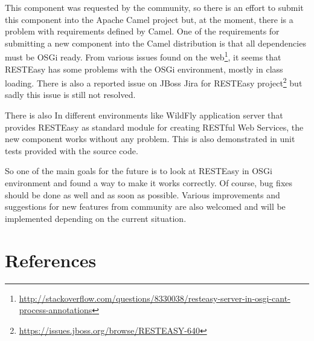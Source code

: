 \documentclass[12pt,final,oneside]{fithesis2}
\begin{document}
This component was requested by the community, so there is an effort to submit this component into the Apache Camel project but, at the moment, there is a problem with requirements defined by Camel. One of the requirements for submitting a new component into the Camel distribution is that all dependencies must be OSGi ready. From various issues found on the web\footnote{\url{http://stackoverflow.com/questions/8330038/resteasy-server-in-osgi-cant-process-annotations}}, it seems that RESTEasy has some problems with the OSGi environment, mostly in class loading. There is also a reported issue on JBoss Jira for RESTEasy project\footnote{\url{https://issues.jboss.org/browse/RESTEASY-640}} but sadly this issue is still not resolved.

There is also  In different environments like WildFly application server that provides RESTEasy as standard module for creating RESTful Web Services, the new component works without any problem. This is also demonstrated in unit tests provided with the source code. 

So one of the main goals for the future is to look at RESTEasy in OSGi environment and found a way to make it works correctly. Of course, bug fixes should be done as well and as soon as possible. Various improvements and suggestions for new features from community are also welcomed and will be implemented depending on the current situation.




\begingroup
\def\tmpchapter{0}
\renewcommand{\chaptername}{}
\renewcommand{\thechapter}{}
\chapter{References}
\renewcommand{\chapter}[2]{}%



\end{document}
